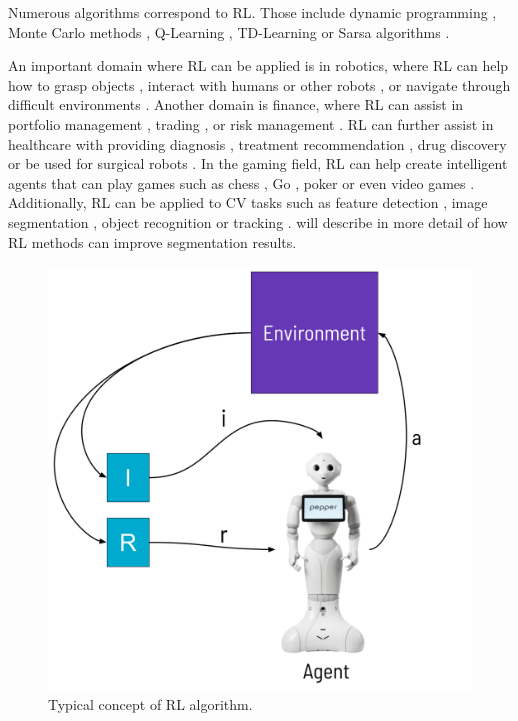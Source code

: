 Numerous algorithms correspond to \ac{RL}. Those include dynamic programming \cite{busoniu2017reinforcement}, Monte Carlo methods \cite{hammersley2013monte}, Q-Learning \cite{van2016deep}, TD-Learning \cite{van2013reinforcement} or Sarsa algorithms \cite{zou2019finite}.

An important domain where \ac{RL} can be applied is in robotics, where \ac{RL} can help how to grasp objects \cite{joshi2020robotic}, interact with humans \cite{akalin2021reinforcement} or other robots \cite{mataric1997reinforcement}, or navigate through difficult environments \cite{liu2020robot}. Another domain is finance, where \ac{RL} can assist in portfolio management \cite{jiang2017deep}, trading \cite{deng2016deep}, or risk management \cite{jiang2017deep}. \ac{RL} can further assist in healthcare with providing diagnosis \cite{kao2018context}, treatment recommendation \cite{gottesman2018evaluating}, drug discovery \cite{zhou2019optimization} or be used for surgical robots \cite{richter2019open}. In the gaming field, \ac{RL} can help create intelligent agents that can play games such as chess \cite{silver2018general}, Go \cite{silver2009reinforcement}, poker \cite{heinrich2016deep} or even video games \cite{shao2019survey}. Additionally, \ac{RL} can be applied to \ac{CV} tasks such as feature detection \cite{bueno2017hierarchical}, image segmentation \cite{sahba2006reinforcement}, object recognition \cite{paletta2000active} or tracking \cite{yun2017action}.  will describe in more detail of how \ac{RL} methods can improve segmentation results.

\begin{figure}[H]%
    \centering
    \includegraphics[width=\imgWidthM]{images/ReinforcementLearning.png}
    \caption[Concept of \acf{RL}]{Typical concept of \acf{RL} algorithm.}
    \label{ReinforcementLearning}
\end{figure}
\newpage

